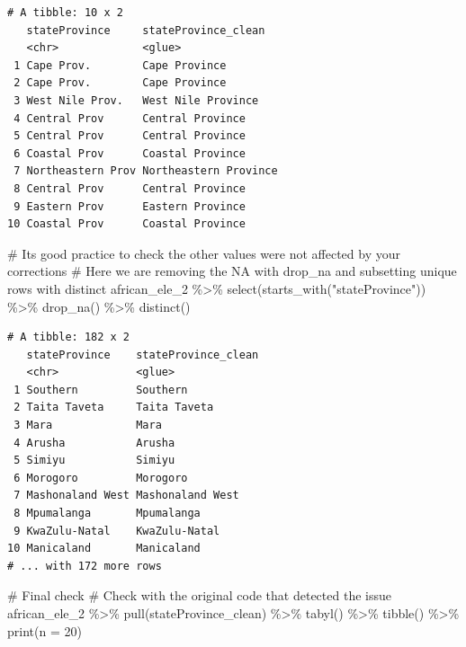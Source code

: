 \documentclass[
  letterpaper,
  DIV=11,
  numbers=noendperiod,
  oneside]{scrreprt}
\newenvironment{Shaded}{\begin{snugshade}}{\end{snugshade}}
\newcommand{\AttributeTok}[1]{\textcolor[rgb]{0.40,0.45,0.13}{#1}}
\newcommand{\CommentTok}[1]{\textcolor[rgb]{0.37,0.37,0.37}{#1}}
\newcommand{\DecValTok}[1]{\textcolor[rgb]{0.68,0.00,0.00}{#1}}
\newcommand{\FunctionTok}[1]{\textcolor[rgb]{0.28,0.35,0.67}{#1}}
\newcommand{\NormalTok}[1]{\textcolor[rgb]{0.00,0.23,0.31}{#1}}
\newcommand{\SpecialCharTok}[1]{\textcolor[rgb]{0.37,0.37,0.37}{#1}}
\newcommand{\StringTok}[1]{\textcolor[rgb]{0.13,0.47,0.30}{#1}}
\begin{document}
\begin{verbatim}
# A tibble: 10 x 2
   stateProvince     stateProvince_clean  
   <chr>             <glue>               
 1 Cape Prov.        Cape Province        
 2 Cape Prov.        Cape Province        
 3 West Nile Prov.   West Nile Province   
 4 Central Prov      Central Province     
 5 Central Prov      Central Province     
 6 Coastal Prov      Coastal Province     
 7 Northeastern Prov Northeastern Province
 8 Central Prov      Central Province     
 9 Eastern Prov      Eastern Province     
10 Coastal Prov      Coastal Province     
\end{verbatim}

\begin{Shaded}
\begin{Highlighting}[]
\CommentTok{\# Its good practice to check the other values were not affected by your corrections}
\CommentTok{\# Here we are removing the NA with \textasciigrave{}drop\_na\textasciigrave{} and subsetting unique rows with \textasciigrave{}distinct\textasciigrave{}}
\NormalTok{african\_ele\_2 }\SpecialCharTok{\%\textgreater{}\%} 
  \FunctionTok{select}\NormalTok{(}\FunctionTok{starts\_with}\NormalTok{(}\StringTok{"stateProvince"}\NormalTok{)) }\SpecialCharTok{\%\textgreater{}\%} 
  \FunctionTok{drop\_na}\NormalTok{() }\SpecialCharTok{\%\textgreater{}\%} 
  \FunctionTok{distinct}\NormalTok{() }
\end{Highlighting}
\end{Shaded}

\begin{verbatim}
# A tibble: 182 x 2
   stateProvince    stateProvince_clean
   <chr>            <glue>             
 1 Southern         Southern           
 2 Taita Taveta     Taita Taveta       
 3 Mara             Mara               
 4 Arusha           Arusha             
 5 Simiyu           Simiyu             
 6 Morogoro         Morogoro           
 7 Mashonaland West Mashonaland West   
 8 Mpumalanga       Mpumalanga         
 9 KwaZulu-Natal    KwaZulu-Natal      
10 Manicaland       Manicaland         
# ... with 172 more rows
\end{verbatim}

\begin{Shaded}
\begin{Highlighting}[]
\CommentTok{\# Final check}
\CommentTok{\# Check with the original code that detected the issue}
\NormalTok{african\_ele\_2 }\SpecialCharTok{\%\textgreater{}\%}
  \FunctionTok{pull}\NormalTok{(stateProvince\_clean) }\SpecialCharTok{\%\textgreater{}\%} 
  \FunctionTok{tabyl}\NormalTok{() }\SpecialCharTok{\%\textgreater{}\%} 
  \FunctionTok{tibble}\NormalTok{() }\SpecialCharTok{\%\textgreater{}\%} 
  \FunctionTok{print}\NormalTok{(}\AttributeTok{n =} \DecValTok{20}\NormalTok{)}
\end{Highlighting}
\end{Shaded}
\end{document}
